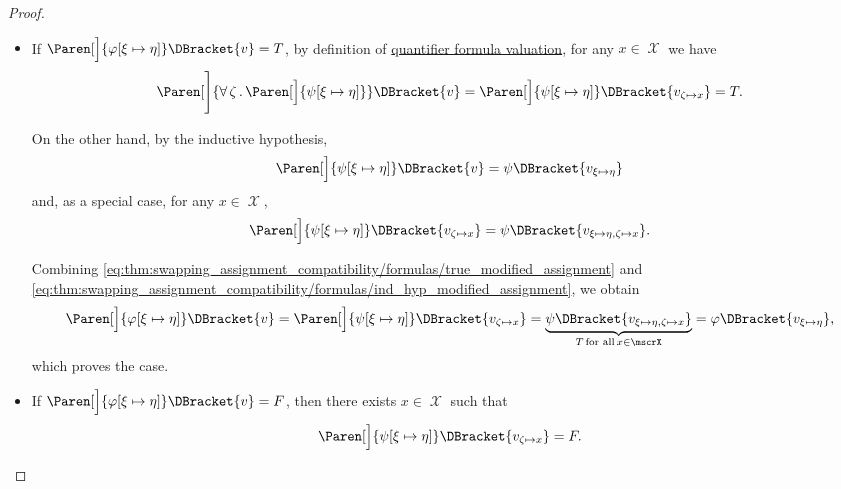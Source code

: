 \begin{proof}
\begin{itemize}
\begin{itemize}
      \begin{itemize}
        \item If \( \Paren[\Big]{\varphi[\xi \mapsto \eta]}\DBracket{v} = T \), by definition of \hyperref[def:first_order_valuation/formula_valuation]{quantifier formula valuation}, for any \( x \in \mscrX \) we have
        \begin{equation}\label{eq:thm:swapping_assignment_compatibility/formulas/true_modified_assignment}
          \Paren[\Bigg]{\ForAll{\zeta} \Paren[\Big]{ \psi[\xi \mapsto \eta] }}\DBracket{v}
          =
          \Paren[\Big]{\psi[\xi \mapsto \eta]}\DBracket{v_{\zeta \mapsto x}}
          =
          T.
        \end{equation}

        On the other hand, by the inductive hypothesis,
        \begin{equation*}
          \Paren[\Big]{ \psi[\xi \mapsto \eta] }\DBracket{v} = \psi\DBracket{v_{\xi \mapsto \eta}}
        \end{equation*}
        and, as a special case, for any \( x \in \mscrX \),
        \begin{equation}\label{eq:thm:swapping_assignment_compatibility/formulas/ind_hyp_modified_assignment}
          \Paren[\Big]{ \psi[\xi \mapsto \eta] }\DBracket{v_{\zeta \mapsto x}} = \psi\DBracket{v_{\xi \mapsto \eta, \zeta \mapsto x}}.
        \end{equation}

        Combining \eqref{eq:thm:swapping_assignment_compatibility/formulas/true_modified_assignment} and \eqref{eq:thm:swapping_assignment_compatibility/formulas/ind_hyp_modified_assignment}, we obtain
        \begin{equation*}
          \Paren[\Big]{ \varphi[\xi \mapsto \eta] }\DBracket{v}
          =
          \Paren[\Big]{ \psi[\xi \mapsto \eta] }\DBracket{v_{\zeta \mapsto x}}
          =
          \underbrace{\psi\DBracket{v_{\xi \mapsto \eta, \zeta \mapsto x}}}_{T \T{for all} x \in \mscrX}
          =
          \varphi\DBracket{v_{\xi \mapsto \eta}},
        \end{equation*}
        which proves the case.

        \item If \( \Paren[\Big]{\varphi[\xi \mapsto \eta]}\DBracket{v} = F \), then there exists \( x \in \mscrX \) such that
        \begin{equation*}
          \Paren[\Big]{\psi[\xi \mapsto \eta]}\DBracket{v_{\zeta \mapsto x}} = F.
        \end{equation*}


\end{itemize}
\end{itemize}
\end{itemize}
\end{proof}
